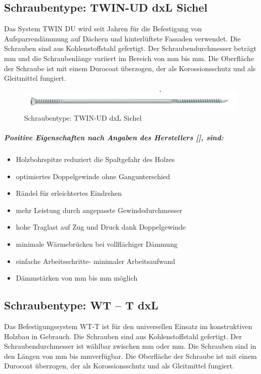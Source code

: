 \subsection{Schraubentype: TWIN-UD dxL Sichel }
Das System TWIN DU wird seit Jahren für die Befestigung von Aufsparrendämmung auf Dächern  und hinterlüftete Fassaden verwendet. Die Schrauben sind aus Kohlenstoffstahl gefertigt. Der Schraubendurchmesser beträgt \unit[7,5]{mm} und die Schraubenlänge variiert im Bereich von \unit[160]{mm} bis \unit[480]{mm}. Die Oberfläche der Schraube ist mit einem Durocoat überzogen, der als Korossionsschutz und als Gleitmittel fungiert.

\begin{figure}[h]
\begin{center}
\includegraphics[scale =0.7]{Verbindungsmittel/schrauben/TWIN-UDdxLSichel.png}
\caption{Schraubentype: TWIN-UD dxL Sichel}
\end{center}
\end{figure}


\subparagraph{Positive Eigenschaften nach Angaben des Herstellers [], sind:}

\begin{itemize}
	\item Holzbohrspitze reduziert die Spaltgefahr des 	Holzes
	\item optimiertes Doppelgewinde ohne		 Gangunterschied
	\item Rändel für erleichtertes Eindrehen
	\item mehr Leistung durch angepasste 	Gewindedurchmesser
	\item hohe Traglast auf Zug und Druck dank 	Doppelgewinde
	\item minimale Wärmebrücken bei vollflächiger 	Dämmung
	\item einfache Arbeitsschritte- minimaler 	Arbeitsaufwand
	\item Dämmstärken von \unit[60]{mm} bis \unit[300]{mm} möglich
\end{itemize}


\subsection{Schraubentype: WT – T dxL }
Das Befestigungssystem WT-T ist für den universellen Einsatz im konstruktiven Holzbau in Gebrauch. Die Schrauben sind aus Kohlenstoffstahl gefertigt. Der Schraubendurchmesser ist wählbar zwischen \unit[6,5]{mm} oder \unit[8,2]{mm}. Die Schrauben sind in den Längen von  \unit[65]{mm} bis \unit[330]{mm}verfügbar. Die Oberfläche der Schraube ist mit einem Durocoat überzogen, der als Korossionsschutz und als Gleitmittel fungiert.

